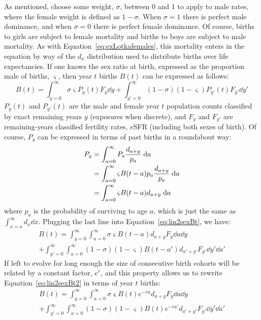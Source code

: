  \FloatBarrier
\label{sec:2sexlinearmain}
As mentioned, choose some weight, $\sigma$, between 0 and 1 to apply to male
rates, where the female weight is defined as $1 - \sigma$. When $\sigma = 1$
there is perfect male dominance, and when $\sigma = 0$ there is perfect female
dominance. Of course, births to girls are subject to female mortality and births
to boys are subject to male mortality. As with
Equation~\eqref{eq:exLotkafemales}, this mortality enters in the equation by way
of the $d_x$ distribution used to distribute births over life expectancies. If
one knows the sex ratio at birth, expressed as the proportion male of births,
$\varsigma$, then year $t$ births $B(t)$ can be expressed as follows:
\begin{equation}
\label{eq:lin2sexBt}
B(t) = \int_{y=0}^\infty \sigma \varsigma P_y(t) F_y \dd y + \int_{y'=0}^\infty
(1-\sigma) (1-\varsigma) P_{y'}(t) F_{y'} \dd y'
\end{equation}
$P_y(t)$ and $P_{y'}(t)$ are the male and female year $t$ population
counts classified by exact remaining years $y$ (exposures when discrete), and
$F_y$ and $F_{y'}$ are remaining-years classified fertility rates, $e$SFR
(including both sexes of birth). Of course, $P_y$ can be expressed in terms
of past births in a roundabout way:
\begin{align}
\label{eq:rexpressPy}
P_y &= \int_{a=0}^\infty P_a \frac{d_{a+y}}{p_a} \; \mathrm{d} a \notag \\
    &= \int_{a=0}^\infty \varsigma B(t-a)p_a \frac{d_{a+y}}{p_a} \; \mathrm{d} a \notag \\
    &= \int_{a=0}^\infty \varsigma B(t-a)d_{a+y} \; \mathrm{d} a
\end{align}
where $p_a$ is the probability of surviving to age $a$, which is just the same
as $\int_{x=a}^\infty d_x \dd x$. Plugging the last line into
Equation~\eqref{eq:lin2sexBt}, we have:
\begin{equation}
\begin{split}
\label{eq:lin2sexBt2}
B(t) = \int_{y=0}^\infty \int_{a=0}^\infty \sigma \varsigma B(t-a)d_{a+y} 
F_y \dd a \dd y \\+ \int_{y'=0}^\infty \int_{a=0}^\infty (1-\sigma)
(1-\varsigma) B(t-a')d_{a'+y'} F_{y'} \dd y' \dd a'
\end{split}
\end{equation}
If left to evolve for long enough the size of consecutive birth cohorts will be
related by a constant factor, $e^r$, and this property allows us to rewrite
Equation~\eqref{eq:lin2sexBt2} in terms of year $t$ births:
\begin{equation}
\begin{split}
\label{eq:lin2sexBt3}
B(t) = \int_{y=0}^\infty \int_{a=0}^\infty \sigma \varsigma B(t)e^{-ra}d_{a+y} 
F_y \dd a \dd y \\+ \int_{y'=0}^\infty \int_{a=0}^\infty (1-\sigma)
(1-\varsigma) B(t)e^{-ra'}d_{a'+y'} F_{y'} \dd y' \dd a'
\end{split}
\end{equation} 
